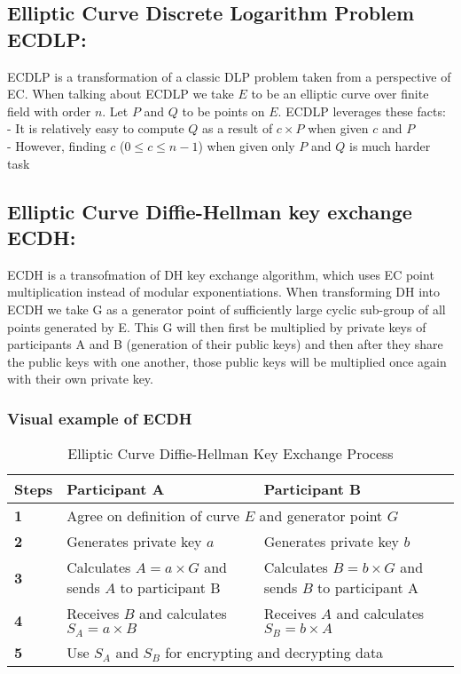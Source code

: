 \documentclass[bp,en]{FEIstyle}
\begin{document}
\subsection*{Elliptic Curve Discrete Logarithm Problem ECDLP:}
ECDLP is a transformation of a classic DLP problem taken from a perspective of EC. When talking about ECDLP we take $E$ to be an elliptic curve over finite field with order $n$. Let $P$ and $Q$ to be points on $E$. ECDLP leverages these facts:\\
- It is relatively easy to compute $Q$ as a result of $c\times P$ when given $c$ and $P$ \\
- However, finding $c$ ($0\leq c \leq n-1$) when given only $P$ and $Q$ is much harder task
\subsection*{Elliptic Curve Diffie-Hellman key exchange ECDH:}
ECDH is a transofmation of DH key exchange algorithm, which uses EC point multiplication instead of modular exponentiations. When transforming DH into ECDH we take G as a generator point of sufficiently large cyclic sub-group of all points generated by E. This G will then first be multiplied by private keys of participants A and B (generation of their public keys) and then after they share the public keys with one another, those public keys will be multiplied once again with their own private key.
\subsubsection*{Visual example of ECDH}
\begin{table}[h!]
\centering
\small %
\begin{tabular}{|p{1cm}|p{5cm}|p{5cm}|} %
\hline
\textbf{Steps} & \textbf{Participant A} & \textbf{Participant B} \\ \hline
\textbf{1} & \multicolumn{2}{p{10cm}|}{Agree on definition of curve \(E\) and generator point \( G\)} \\ \hline
\textbf{2} & Generates private key \( a \) & Generates private key \( b \)  \\ \hline
\textbf{3} & Calculates \( A = a\times G \) and sends \( A \) to participant B & Calculates \( B = b\times G \) and sends \( B \) to participant A \\ \hline
\textbf{4} & Receives \( B \)  and calculates \( S_A = a\times B  \) & Receives \( A \)  and calculates \( S_B = b\times A  \) \\ \hline
\textbf{5} & \multicolumn{2}{p{10cm}|}{Use \(S_A\) and \(S_B\) for encrypting and decrypting data } \\ \hline
\end{tabular}
\caption{Elliptic Curve Diffie-Hellman Key Exchange Process}
\label{tab:diffie_hellman}
\end{table}
\end{document}
